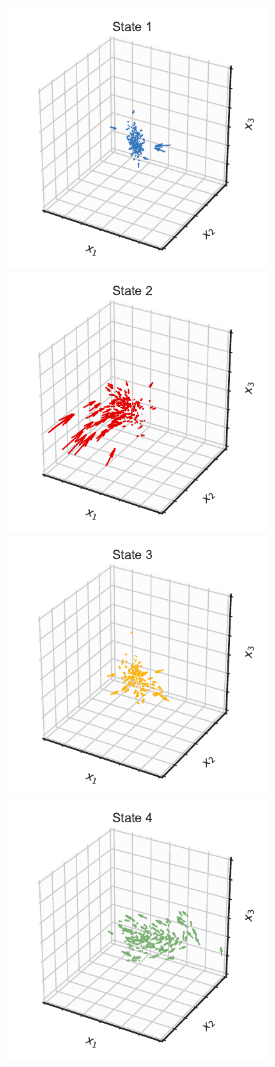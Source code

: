 \documentclass{article}
\begin{document}
\begin{figure}[h]
\centering%
\includegraphics[width=2.7in]{figures/arhmm/dynamics_123_0.pdf}
\includegraphics[width=2.7in]{figures/arhmm/dynamics_123_1.pdf}
\\
\includegraphics[width=2.7in]{figures/arhmm/dynamics_123_2.pdf}
\includegraphics[width=2.7in]{figures/arhmm/dynamics_123_3.pdf}

\end{figure}
\end{document}
